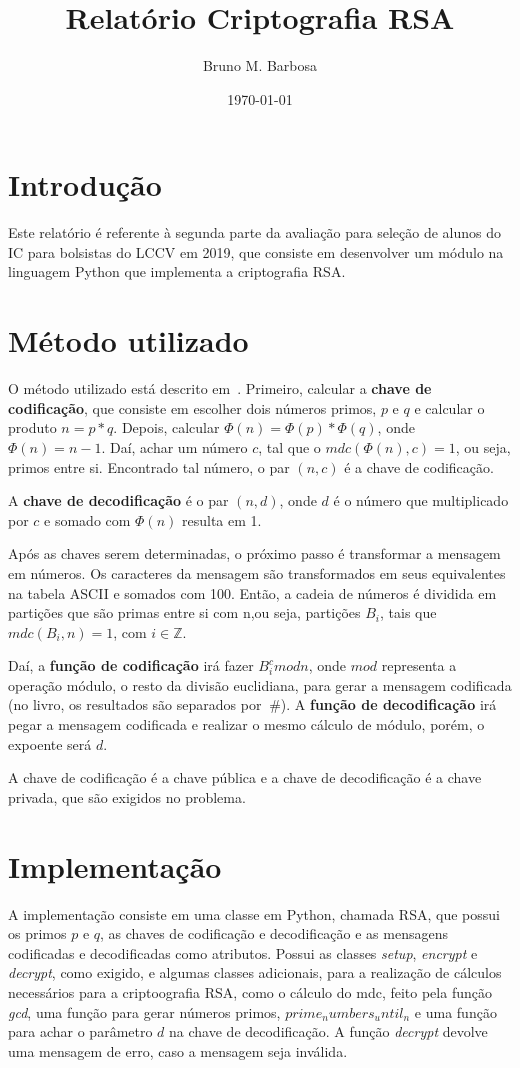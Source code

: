 \documentclass{article}
\title{Relatório Criptografia RSA}
\date{\today}
\author{Bruno M. Barbosa}
\begin{document}
\maketitle

\section{Introdução}
Este relatório é referente à segunda parte da avaliação para seleção de alunos do IC para bolsistas do LCCV em 2019, que consiste em desenvolver um módulo na linguagem Python que implementa a criptografia RSA. 

\section{Método utilizado}
O método utilizado está descrito em~\cite{Evaristo2012}.  Primeiro, calcular a \textbf{chave de codificação}, que consiste em escolher dois números primos, $p$ e $q$ e calcular o produto $n = p * q$. Depois, calcular $\Phi(n) = \Phi(p) * \Phi(q)$, onde $\Phi(n) = n - 1$. Daí, achar um número $c$, tal que o $mdc(\Phi(n), c) = 1$, ou seja, primos entre si. Encontrado tal número, o par $(n, c)$ é a chave de codificação.

A \textbf{chave de decodificação} é o par $(n, d)$, onde $d$ é o número que multiplicado por $c$ e somado com $\Phi(n)$ resulta em 1.

Após as chaves serem determinadas, o próximo passo é transformar a mensagem em números. Os caracteres da mensagem são transformados em seus equivalentes na tabela ASCII e somados com 100. Então, a cadeia de números é dividida em partições que são primas entre si com n,ou seja, partições $B_i$, tais que $mdc(B_i, n) = 1$, com $i \in \mathbb{Z}$. 

Daí, a \textbf{função de codificação} irá fazer $B_i^c mod n$, onde $mod$ representa a operação módulo, o resto da divisão euclidiana, para gerar a mensagem codificada (no livro, os resultados são separados por $~\#$). A \textbf{função de decodificação} irá pegar a mensagem codificada e realizar o mesmo cálculo de módulo, porém, o expoente será $d$.

A chave de codificação é a chave pública e a chave de decodificação é a chave privada, que são exigidos no problema. 

\section{Implementação}
A implementação consiste em uma classe em Python, chamada RSA, que possui os primos $p$ e $q$, as chaves de codificação e decodificação e as mensagens codificadas e decodificadas como atributos. Possui as classes \textit{setup}, \textit{encrypt} e \textit{decrypt}, como exigido, e algumas classes adicionais, para a realização de cálculos necessários para a criptoografia RSA, como o cálculo do mdc, feito pela função \textit{gcd}, uma função para gerar números primos, \textit{$prime_numbers_until_n$} e uma função para achar o parâmetro $d$ na chave de decodificação. A função \textit{decrypt} devolve uma mensagem de erro, caso a mensagem seja inválida.



\end{document}
